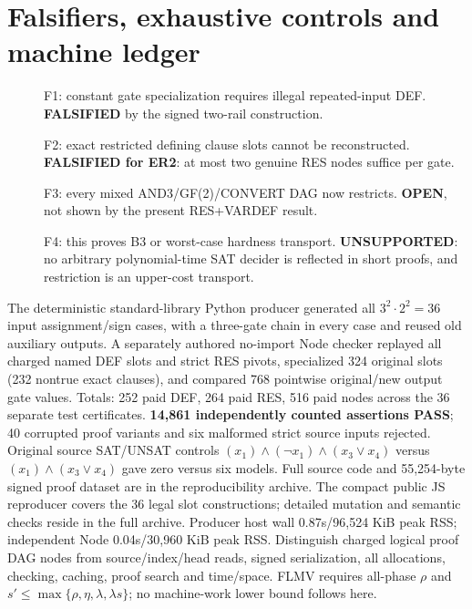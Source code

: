 \documentclass[11pt]{article}
\begin{document}
\section*{Falsifiers, exhaustive controls and machine ledger}
\begin{description}
\item[] F1: constant gate specialization requires illegal repeated-input DEF. \textbf{FALSIFIED} by the signed two-rail construction.
\item[] F2: exact restricted defining clause slots cannot be reconstructed. \textbf{FALSIFIED for ER2}: at most two genuine RES nodes suffice per gate.
\item[] F3: every mixed AND3/GF(2)/CONVERT DAG now restricts. \textbf{OPEN}, not shown by the present RES+VARDEF result.
\item[] F4: this proves B3 or worst-case hardness transport. \textbf{UNSUPPORTED}: no arbitrary polynomial-time SAT decider is reflected in short proofs, and restriction is an upper-cost transport.
\end{description}
The deterministic standard-library Python producer generated all $3^2\cdot2^2=36$ input assignment/sign cases, with a three-gate chain in every case and reused old auxiliary outputs. A separately authored no-import Node checker replayed all charged named DEF slots and strict RES pivots, specialized 324 original slots (232 nontrue exact clauses), and compared 768 pointwise original/new output gate values. Totals: 252 paid DEF, 264 paid RES, 516 paid nodes across the 36 separate test certificates. \textbf{14,861 independently counted assertions PASS}; 40 corrupted proof variants and six malformed strict source inputs rejected. Original source SAT/UNSAT controls $(x_1)\wedge(\neg x_1)\wedge(x_3\vee x_4)$ versus $(x_1)\wedge(x_3\vee x_4)$ gave zero versus six models. Full source code and 55,254-byte signed proof dataset are in the reproducibility archive. The compact public JS reproducer covers the 36 legal slot constructions; detailed mutation and semantic checks reside in the full archive.
Producer host wall 0.87s/96,524 KiB peak RSS; independent Node 0.04s/30,960 KiB peak RSS. Distinguish charged logical proof DAG nodes from source/index/head reads, signed serialization, all allocations, checking, caching, proof search and time/space. FLMV requires all-phase $\rho$ and $s'\le\max\{\rho,\eta,\lambda,\lambda s\}$; no machine-work lower bound follows here.
\end{document}
